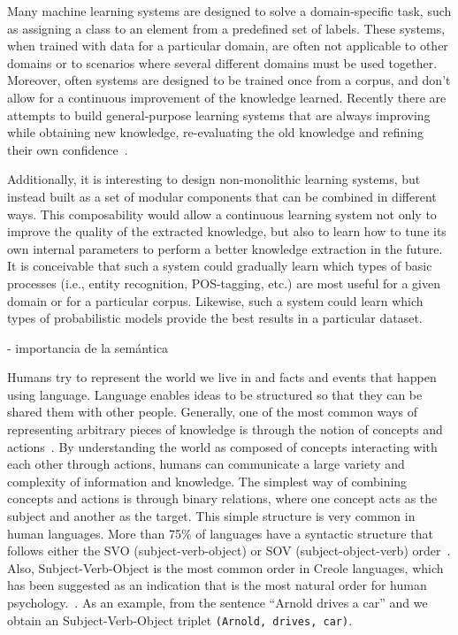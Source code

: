 Many machine learning systems are designed to solve a domain-specific task, such as
assigning a class to an element from a predefined set of labels. These systems,
when trained with data for a particular domain, are often not applicable to other domains
or to scenarios where several different domains must be used together. Moreover,
often systems are designed to be trained once from a corpus, and don't allow for
a continuous improvement of the knowledge learned.
Recently there are attempts to build general-purpose learning systems that are always
improving while obtaining new knowledge, re-evaluating the old knowledge and refining their
own confidence~\cite{mitchell2015never}.

Additionally, it is interesting to design non-monolithic learning systems, but instead
built as a set of modular components that can be combined in different ways.
This composability would allow a continuous learning system not only to improve the
quality of the extracted knowledge, but also to learn how to tune its own internal
parameters to perform a better knowledge extraction in the future. It is conceivable
that such a system could gradually learn which types of basic processes (i.e., entity recognition, POS-tagging, etc.)
are most useful for a given domain or for a particular corpus. Likewise, such a system could
learn which types of probabilistic models provide the best results in a particular dataset.


- importancia de la semántica


Humans try to represent the world we live in and facts and events that happen using language. Language enables ideas to be structured so that they can be shared them with other people.
Generally, one of the most common ways of representing arbitrary pieces of knowledge is through the notion of concepts and actions~\cite{teleologies}.
By understanding the world as composed of concepts interacting with each other through actions, humans can communicate a large variety and
complexity of information and knowledge.
The simplest way of combining concepts and actions is through binary relations, where one concept acts as the subject and another as the target.
This simple structure is very common in human languages.
More than 75\% of languages have a syntactic structure that follows either the SVO (subject-verb-object) or SOV (subject-object-verb) order~\cite{cambridge}.
Also, Subject-Verb-Object is the most common order in Creole languages, which has been suggested as an indication that is the most natural order
for human psychology.~\cite{diamond2013rise}.
As an example, from the sentence ``Arnold drives a car'' and we obtain an Subject-Verb-Object triplet \verb|(Arnold, drives, car)|.

